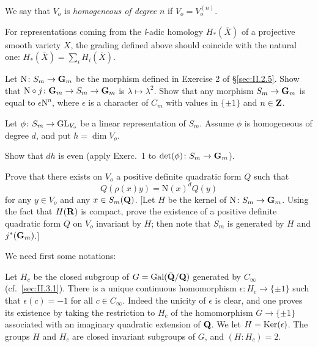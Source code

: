 We say that $V_o$ is \emph{homogeneous of degree} $n$ if
$V_o = V_o^{(n)}$.


For representations coming from the \textit{l}-adic homology
$H_*(\bar{X})$ of a projective smooth variety $X$, the grading defined
above should coincide with the natural one:
$H_*(\bar{X}) = \sum\limits_i H_i(\bar{X})$.


\begin{nlist}
\item Let $\mathrm{N}\colon S_m \to \mathbf{G}_m$ be the morphism defined in
Exercise 2 of \S\ref{sec:II.2.5}.  Show that
$\mathrm{N} \circ j\colon \mathbf{G}_m \to S_m \to \mathbf{G}_m$ is
$\lambda \mapsto \lambda^2$.  Show that any morphism $S_m \to \mathbf{G}_m$ is
equal to $\epsilon \mathrm{N}^n$, where $\epsilon$ is a character of
$C_m$ with values in $\{\pm 1\}$ and $n \in \mathbf{Z}$.

\item Let $\phi\colon S_m \to \mathrm{GL}_{V_o}$ be a linear representation of
$S_m$.  Assume $\phi$ is homogeneous of degree $d$, and put
$h = \dim V_o$.
\begin{alist}
\item Show that $dh$ is even (apply Exerc.~1 to
$\det(\phi)\colon S_m \to \mathbf{G}_m$).

\item Prove that there exists on $V_o$ a positive definite quadratic
form $Q$ such that
\[
Q(\rho(x)y) = \mathrm{N}(x)^d Q(y)
\]
for any $y \in V_o$ and any $x \in S_m(\mathbf{Q})$.  [Let $H$ be the kernel of
$\mathrm{N}\colon S_m \to \mathbf{G}_m$.  Using the fact that $H(\mathbf{R})$ is compact,
prove the existence of a positive definite quadratic form $Q$ on $V_o$
invariant by $H$; then note that $S_m$ is generated by $H$ and
$j^*(\mathbf{G}_m)$.]
\end{alist}
\end{nlist}


We need first some notations:

Let $H_c$ be the closed subgroup of $G = \mathrm{Gal}(\bar{\mathbf{Q}}/\mathbf{Q})$ generated by
$C_\infty$ (cf.~\ref{sec:II.3.1}).  There is a unique continuous homomorphism
$\epsilon\colon H_c \to \{\pm 1\}$ such that $\epsilon(c) = -1$ for all
$c \in C_\infty$.  Indeed the unicity of $\epsilon$ is clear, and one
proves its existence by taking the restriction to $H_c$ of the
homomorphism $G \to \{\pm 1\}$ associated with an imaginary quadratic
extension of $\mathbf{Q}$.  We let $H = \mathrm{Ker}(\epsilon)$.  The groups $H$ and
$H_c$ are closed invariant subgroups of $G$, and $(H : H_c) = 2$.

